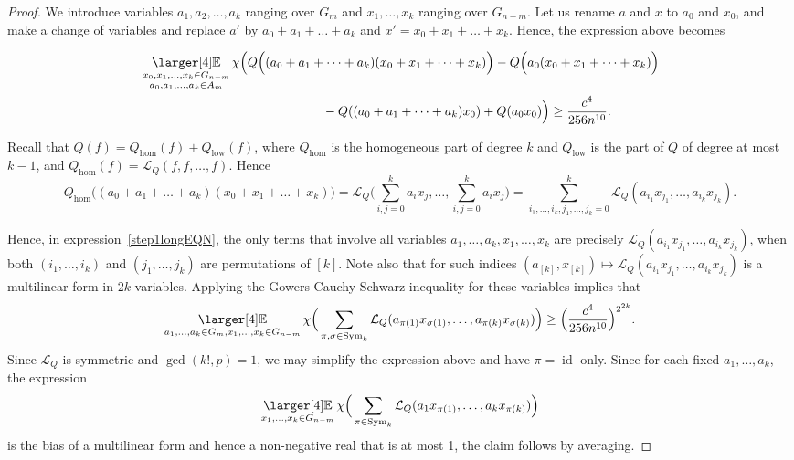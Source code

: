 \documentclass[a4paper,11pt]{article}
\theoremstyle{definition}
\newcommand{\on}[1]{
	\operatorname{#1}
}
\newcommand\ssk[1]{
	\substack{#1}
}
\newcommand{\exx}{
  \mathop{
    \mathchoice{\vcenter{\hbox{\larger[4]$\mathbb{E}$}}}
               {\kern0pt\mathbb{E}}
               {\kern0pt\mathbb{E}}
               {\kern0pt\mathbb{E}}
  }\displaylimits
}
\begin{document}
\begin{proof}
    We introduce variables $a_1, a_2, \dots, a_k$ ranging over $G_m$ and $x_1, \dots, x_k$ ranging over $G_{n-m}$. Let us rename $a$ and $x$ to $a_0$ and $x_0$, and make a change of variables and replace $a'$ by $a_0 + a_1 + \ldots + a_k$ and $x' = x_0 + x_1 + \ldots + x_k$. Hence, the expression above becomes

    \begin{align} &\exx_{\ssk{x_0, x_1, \dots, x_k \in G_{n- m}\\a_0,a_1, \dots, a_k \in A_m}} \chi\Big(Q\Big((a_0 + a_1 + \dots + a_k)(x_0 + x_1 + \dots + x_k)\Big) - Q\Big(a_0(x_0 + x_1 + \dots + x_k)\Big) \label{step1longEQN}\\
    &\hspace{5cm}- Q((a_0 + a_1 + \dots + a_k)x_0) + Q(a_0x_0)\Big) \geq \frac{c^4}{256n^{10}}.\nonumber\end{align}

    Recall that $Q(f) = Q_{\on{hom}}(f) + Q_{\on{low}}(f)$, where $Q_{\on{hom}}$ is the homogeneous part of degree $k$ and $Q_{\on{low}}$ is the part of $Q$ of degree at most $k-1$, and $Q_{\on{hom}}(f) = \mathcal{L}_Q(f,f,\dots,f)$. Hence
    \[Q_{\on{hom}}\Big((a_0 + a_1 + \dots + a_k)(x_0 + x_1 + \dots + x_k)\Big) = \mathcal{L}_Q\Big(\sum_{i,j = 0}^k a_ix_j, \dots, \sum_{i,j = 0}^k a_ix_j\Big) = \sum_{i_1, \dots, i_k, j_1, \dots, j_k = 0}^k  \mathcal{L}_Q(a_{i_1}x_{j_1}, \dots, a_{i_k}x_{j_k}).\]

    Hence, in expression~\eqref{step1longEQN}, the only terms that involve all variables $a_1, \dots, a_k, x_1, \dots, x_k$ are precisely $\mathcal{L}_Q(a_{i_1}x_{j_1}, \dots, a_{i_k}x_{j_k})$, when both $(i_1, \dots, i_k)$ and $(j_1, \dots, j_k)$ are permutations of $[k]$. Note also that for such indices $(a_{[k]}, x_{[k]}) \mapsto \mathcal{L}_Q(a_{i_1}x_{j_1}, \dots, a_{i_k}x_{j_k})$ is a multilinear form in $2k$ variables. Applying the Gowers-Cauchy-Schwarz inequality for these variables implies that 
    \[\exx_{a_1, \dots, a_k \in G_m, x_1, \dots, x_k \in G_{n - m}} \chi\Big(\sum_{\pi, \sigma \in \on{Sym}_k} \mathcal{L}_Q(a_{\pi(1)} x_{\sigma(1)}, \dots, a_{\pi(k)} x_{\sigma(k)})\Big) \geq \Big( \frac{c^4}{256n^{10}}\Big)^{2^{2k}}.\]
    Since $\mathcal{L}_Q$ is symmetric and $\on{gcd}(k!, p) = 1$, we may simplify the expression above and have $\pi = \on{id}$ only. Since for each fixed $a_1, \dots, a_k$, the expression 
    \[\exx_{x_1, \dots, x_k \in G_{n - m}} \chi\Big(\sum_{\pi \in \on{Sym}_k}\mathcal{L}_Q(a_1x_{\pi(1)},\ldots, a_k x_{\pi(k)})\Big)\]
    is the bias of a multilinear form and hence a non-negative real that is at most 1, the claim follows by averaging.
\end{proof}
\end{document}

